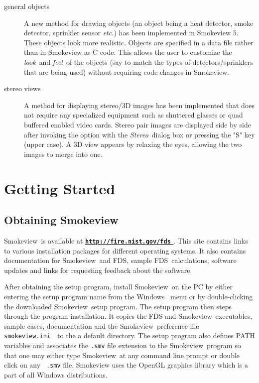 \documentclass[11pt,twoside]{book}
\newcommand{\svini}{{\tt smokeview.ini}\ }
\newcommand{\hhref}[1]{\href{#1}{{\tt #1}
}}
\newcommand{\fds}{{FDS}}
\newcommand{\Smokeview}{{Smokeview}}
\newcommand{\smokeview}{{Smokeview}}
\begin{document}
\begin{description}
\item[general objects]A new method for drawing objects (an object
being a heat detector, smoke detector, sprinkler sensor {\em
etc.}) has been implemented in Smokeview 5.  These objects look
more realistic.  Objects are specified in a data file rather than
in Smokeview as C code. This allows the user to customize the
{\em look}\ and {\em feel}\ of the objects (say to match the types of
detectors/sprinklers that are being used) without requiring code
changes in Smokeview.

\item[stereo views]A method for displaying stereo/3D images has been implemented that does
not require any specialized equipment such as shuttered glasses or quad buffered enabled video cards.  Stereo pair images are displayed side by side after invoking the option with
the {\em Stereo}\ dialog box or pressing the "S" key (upper case).  A 3D view appears by relaxing the eyes, allowing the two images to merge into one.

\end{description}


\chapter{Getting Started}

\section{Obtaining Smokeview}

\Smokeview\ is available at {\bf \hhref{http://fire.nist.gov/fds}}. This site contains links to various installation
packages for different operating systems. It also
contains documentation for \smokeview\ and \fds, sample \fds\ calculations, software updates and links for requesting feedback about the software.

After obtaining the setup program, install \smokeview\  on the PC
by either entering the setup program name from the Windows
\ menu or by double-clicking the downloaded
\smokeview\  setup program. The setup program then steps through
the program installation. It copies the FDS and \smokeview\
executables, sample cases, documentation and the \smokeview\
preference file \svini\ to the a default directory.  The setup program also
defines PATH variables and associates the {\tt .smv} file
extension to the \smokeview\ program so that one may either type
\smokeview\ at any command line prompt or double click on any {\tt
.smv} file. Smokeview uses the OpenGL graphics library which is a
part of all Windows distributions.
\end{document}
